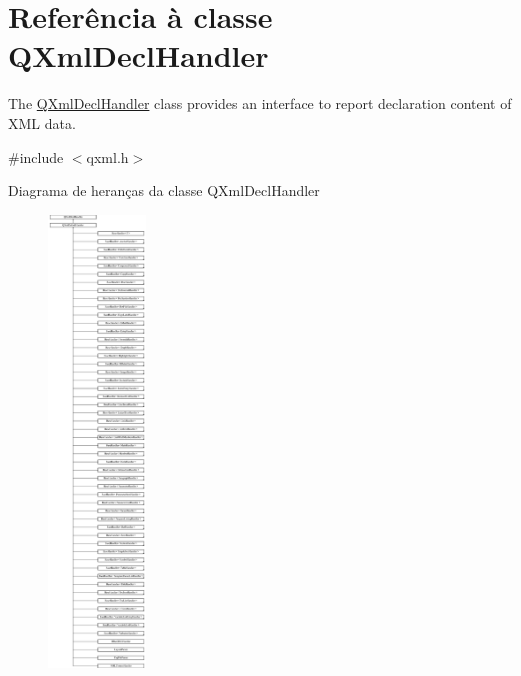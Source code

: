 \hypertarget{class_q_xml_decl_handler}{\section{Referência à classe Q\-Xml\-Decl\-Handler}
\label{class_q_xml_decl_handler}
}


The \hyperlink{class_q_xml_decl_handler}{Q\-Xml\-Decl\-Handler} class provides an interface to report declaration content of X\-M\-L data.  




{\ttfamily \#include $<$qxml.\-h$>$}

Diagrama de heranças da classe Q\-Xml\-Decl\-Handler\begin{figure}[H]
\begin{center}
\leavevmode
\includegraphics[height=12.000000cm]{class_q_xml_decl_handler}
\end{center}
\end{figure}
